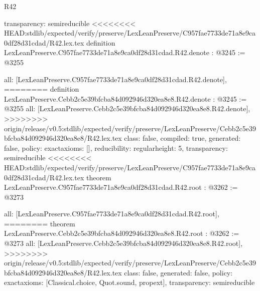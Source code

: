\begin{lexlean}{R42}
\begin{coremodule}
{{{{{{{{{{{{{{{{  transparency: semireducible
}
<<<<<<<< HEAD:stdlib/expected/verify/preserve/LexLeanPreserve/C957fae7733de71a8e9ca0df28d31cdad/R42.lex.tex
definition LexLeanPreserve.C957fae7733de71a8e9ca0df28d31cdad.R42.denote : @3245 := @3255 {
  all: [LexLeanPreserve.C957fae7733de71a8e9ca0df28d31cdad.R42.denote],
========
definition LexLeanPreserve.Cebb2c5e39bfcba84d092946d320ea8e8.R42.denote : @3245 := @3255 {
  all: [LexLeanPreserve.Cebb2c5e39bfcba84d092946d320ea8e8.R42.denote],
>>>>>>>> origin/release/v0.5:stdlib/expected/verify/preserve/LexLeanPreserve/Cebb2c5e39bfcba84d092946d320ea8e8/R42.lex.tex
  class: false,
  compiled: true,
  generated: false,
  policy: exact{axioms: []},
  reducibility: regular{height: 5},
  transparency: semireducible
}
<<<<<<<< HEAD:stdlib/expected/verify/preserve/LexLeanPreserve/C957fae7733de71a8e9ca0df28d31cdad/R42.lex.tex
theorem LexLeanPreserve.C957fae7733de71a8e9ca0df28d31cdad.R42.root : @3262 := @3273 {
  all: [LexLeanPreserve.C957fae7733de71a8e9ca0df28d31cdad.R42.root],
========
theorem LexLeanPreserve.Cebb2c5e39bfcba84d092946d320ea8e8.R42.root : @3262 := @3273 {
  all: [LexLeanPreserve.Cebb2c5e39bfcba84d092946d320ea8e8.R42.root],
>>>>>>>> origin/release/v0.5:stdlib/expected/verify/preserve/LexLeanPreserve/Cebb2c5e39bfcba84d092946d320ea8e8/R42.lex.tex
  class: false,
  generated: false,
  policy: exact{axioms: [Classical.choice, Quot.sound, propext]},
  transparency: semireducible
}

}}}}}}}}}}}}}}}}}
\end{coremodule}
\end{lexlean}

